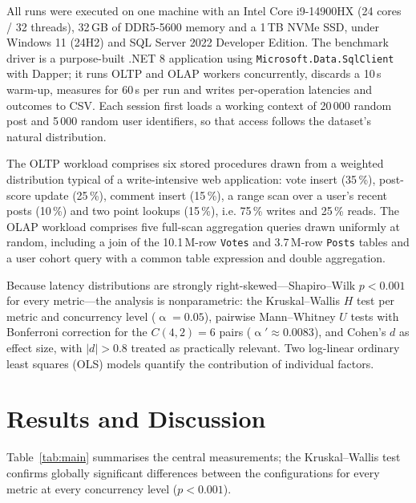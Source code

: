 \documentclass[10pt,conference,a4paper]{IEEEtran}
\begin{document}
All runs were executed on one machine with an Intel Core i9-14900HX
(24 cores / 32 threads), 32\,GB of DDR5-5600 memory and a 1\,TB NVMe SSD,
under Windows 11 (24H2) and SQL Server 2022 Developer Edition. The benchmark driver is a purpose-built .NET 8 application using
\texttt{Microsoft.Data.SqlClient} with Dapper; it runs OLTP and OLAP workers
concurrently, discards a 10\,s warm-up, measures for 60\,s per run and writes
per-operation latencies and outcomes to CSV. Each
session first loads a working context of 20\,000 random post and 5\,000
random user identifiers, so that access follows the dataset's natural
distribution.

The OLTP workload comprises six stored procedures drawn from a weighted
distribution typical of a write-intensive web application: vote insert
(35\,\%), post-score update (25\,\%), comment insert (15\,\%), a range scan
over a user's recent posts (10\,\%) and two point lookups (15\,\%), i.e.
75\,\% writes and 25\,\% reads. The OLAP workload comprises five full-scan
aggregation queries drawn uniformly at random, including a join of the
10.1\,M-row \texttt{Votes} and 3.7\,M-row \texttt{Posts} tables and a user
cohort query with a common table expression and double aggregation.

Because latency distributions are strongly right-skewed---Shapiro--Wilk
$p < 0.001$ for every metric---the analysis is nonparametric: the Kruskal--Wallis $H$ test per metric and concurrency
level ($\upalpha = 0.05$), pairwise Mann--Whitney $U$ tests with Bonferroni
correction for the $C(4,2) = 6$ pairs ($\upalpha' \approx 0.0083$), and
Cohen's $d$ as effect size, with $|d| > 0.8$ treated as practically
relevant. Two log-linear ordinary least squares (OLS) models
quantify the contribution of individual factors.

\section{Results and Discussion}
Table~\ref{tab:main} summarises the central measurements; the
Kruskal--Wallis test confirms globally significant differences between the
configurations for every metric at every concurrency level ($p < 0.001$).
\end{document}
